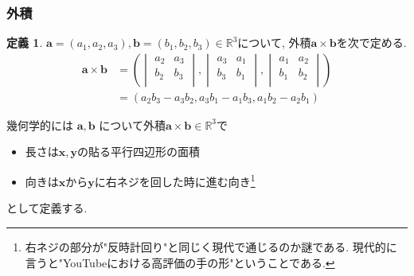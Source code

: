 \documentclass[dvipdfmx,a4paper,11pt]{article}
\newcommand{\R}{\mathbb{R}}
\theoremstyle{definition}
\newtheorem{dfn}[thm]{定義}
\begin{document}
 \subsubsection{外積}
 \begin{tcolorbox}[
    colback = white,
    colframe = green!35!black,
    fonttitle = \bfseries,
    breakable = true]
    \begin{dfn}
$\bm{a}=(a_1, a_2, a_3), \bm{b}=(b_1, b_2, b_3)\in \R^3$について, 外積$\bm{a} \times \bm{b}$を次で定める. 
\begin{align*}
\bm{a} \times \bm{b} 
&=\left(\begin{vmatrix}
a_2&a_3\\
b_2&b_3 \\
\end{vmatrix},
\begin{vmatrix}
a_3&a_1\\
b_3&b_1 \\
\end{vmatrix},
\begin{vmatrix}
a_1&a_2\\
b_1&b_2 \\
\end{vmatrix}
\right)
\\
&=
( a_2b_3 - a_3b_2, a_3b_1-a_1b_3, a_1b_2-a_2b_1)  
\end{align*}
\end{dfn}
 \end{tcolorbox}
 幾何学的には
$\bm{a}, \bm{b}$
について外積$\bm{a} \times \bm{b}  \in \R^3$で
 \begin{itemize}
 	\setlength{\parskip}{0cm}
  	\setlength{\itemsep}{0pt}
\item 長さは$\bm{x}, \bm{y}$の貼る平行四辺形の面積
\item 向きは$\bm{x}$から$\bm{y}$に右ネジを回した時に進む向き\footnote{右ネジの部分が"反時計回り"と同じく現代で通じるのか謎である. 現代的に言うと"YouTubeにおける高評価の手の形"ということである. }
 \end{itemize}
 として定義する. 
 
\end{document}
